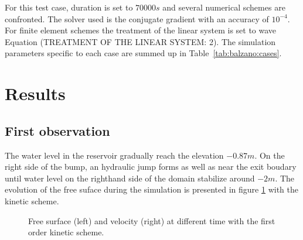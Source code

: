 For this test case, duration is set to $70000 s$ and several numerical schemes 
are confronted. The solver used is the conjugate gradient with an accuracy of $10^{-4}$.
For finite element schemes the treatment of the linear system is set to wave Equation (TREATMENT
OF THE LINEAR SYSTEM: 2). The simulation parameters specific to each case are summed up in Table~\ref{tab:balzano:cases}.
\begin{table}[H]
  \caption{List of the simulation parameters used for the five cases.}
  \label{tab:balzano:cases}
\end{table}

%
\section{Results}

\subsection{First observation}
\label{subsection:balzano:observations}

The water level in the reservoir gradually reach the elevation $-0.87m$. On the right side of the bump, 
an hydraulic jump forms as well as near the exit boudary until water level on the righthand side of the domain 
stabilize around $-2 m$. The evolution of the free suface during the simulation is presented in figure
\ref{fig:balzano:firstobs} with the kinetic scheme.

\begin{figure}[H]
\begin{minipage}[t]{0.5\textwidth}
 \centering
\end{minipage}%
\begin{minipage}[t]{0.5\textwidth}
 \centering
\end{minipage}
  \caption{Free surface (left) and velocity (right) at different time with the first order kinetic scheme.}
  \label{fig:balzano:firstobs}
\end{figure}

